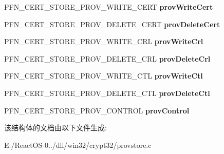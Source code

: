 \begin{DoxyCompactItemize}
P\+F\+N\+\_\+\+C\+E\+R\+T\+\_\+\+S\+T\+O\+R\+E\+\_\+\+P\+R\+O\+V\+\_\+\+W\+R\+I\+T\+E\+\_\+\+C\+E\+RT {\bfseries prov\+Write\+Cert}
\item 
\mbox{\label{struct___w_i_n_e___p_r_o_v_i_d_e_r_s_t_o_r_e_aa42b220bd9333be153c52a71ce887725}} 
P\+F\+N\+\_\+\+C\+E\+R\+T\+\_\+\+S\+T\+O\+R\+E\+\_\+\+P\+R\+O\+V\+\_\+\+D\+E\+L\+E\+T\+E\+\_\+\+C\+E\+RT {\bfseries prov\+Delete\+Cert}
\item 
\mbox{\label{struct___w_i_n_e___p_r_o_v_i_d_e_r_s_t_o_r_e_a2e020fd330c9ce20ca29b75036d3115e}} 
P\+F\+N\+\_\+\+C\+E\+R\+T\+\_\+\+S\+T\+O\+R\+E\+\_\+\+P\+R\+O\+V\+\_\+\+W\+R\+I\+T\+E\+\_\+\+C\+RL {\bfseries prov\+Write\+Crl}
\item 
\mbox{\label{struct___w_i_n_e___p_r_o_v_i_d_e_r_s_t_o_r_e_a90be1d6933ba65273218489f12f8fc60}} 
P\+F\+N\+\_\+\+C\+E\+R\+T\+\_\+\+S\+T\+O\+R\+E\+\_\+\+P\+R\+O\+V\+\_\+\+D\+E\+L\+E\+T\+E\+\_\+\+C\+RL {\bfseries prov\+Delete\+Crl}
\item 
\mbox{\label{struct___w_i_n_e___p_r_o_v_i_d_e_r_s_t_o_r_e_a82a2fd7be5b7776feafe7e622f2059e9}} 
P\+F\+N\+\_\+\+C\+E\+R\+T\+\_\+\+S\+T\+O\+R\+E\+\_\+\+P\+R\+O\+V\+\_\+\+W\+R\+I\+T\+E\+\_\+\+C\+TL {\bfseries prov\+Write\+Ctl}
\item 
\mbox{\label{struct___w_i_n_e___p_r_o_v_i_d_e_r_s_t_o_r_e_a32d08c5116d6c839a37d0084a23750dc}} 
P\+F\+N\+\_\+\+C\+E\+R\+T\+\_\+\+S\+T\+O\+R\+E\+\_\+\+P\+R\+O\+V\+\_\+\+D\+E\+L\+E\+T\+E\+\_\+\+C\+TL {\bfseries prov\+Delete\+Ctl}
\item 
\mbox{\label{struct___w_i_n_e___p_r_o_v_i_d_e_r_s_t_o_r_e_aaa1f70f59248aa72df4a1f708ae618d2}} 
P\+F\+N\+\_\+\+C\+E\+R\+T\+\_\+\+S\+T\+O\+R\+E\+\_\+\+P\+R\+O\+V\+\_\+\+C\+O\+N\+T\+R\+OL {\bfseries prov\+Control}
\end{DoxyCompactItemize}


该结构体的文档由以下文件生成\+:\begin{DoxyCompactItemize}
\item 
E\+:/\+React\+O\+S-\/0../dll/win32/crypt32/provstore.\+c\end{DoxyCompactItemize}
